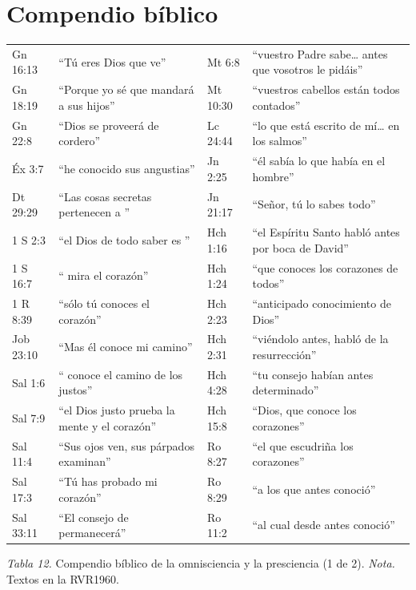 \section*{Compendio bíblico}
\begin{center}\small\renewcommand{\arraystretch}{1.12}
\begin{tabular}{@{}L{2.2cm}L{5.0cm}|L{2.2cm}L{5.0cm}@{}}
\toprule
Gn 16:13 & ``Tú eres Dios que ve'' & Mt 6:8 & ``vuestro Padre sabe\ldots{} antes que vosotros le pidáis'' \\
Gn 18:19 & ``Porque yo sé que mandará a sus hijos'' & Mt 10:30 & ``vuestros cabellos están todos contados'' \\
Gn 22:8 & ``Dios se proveerá de cordero'' & Lc 24:44 & ``lo que está escrito de mí\ldots{} en los salmos'' \\
Éx 3:7 & ``he conocido sus angustias'' & Jn 2:25 & ``él sabía lo que había en el hombre'' \\
Dt 29:29 & ``Las cosas secretas pertenecen a \SENOR{}'' & Jn 21:17 & ``Señor, tú lo sabes todo'' \\
1 S 2:3 & ``el Dios de todo saber es \SENOR{}'' & Hch 1:16 & ``el Espíritu Santo habló antes por boca de David'' \\
1 S 16:7 & ``\SENOR{} mira el corazón'' & Hch 1:24 & ``que conoces los corazones de todos'' \\
1 R 8:39 & ``sólo tú conoces el corazón'' & Hch 2:23 & ``anticipado conocimiento de Dios'' \\
Job 23:10 & ``Mas él conoce mi camino'' & Hch 2:31 & ``viéndolo antes, habló de la resurrección'' \\
Sal 1:6 & ``\SENOR{} conoce el camino de los justos'' & Hch 4:28 & ``tu consejo habían antes determinado'' \\
Sal 7:9 & ``el Dios justo prueba la mente y el corazón'' & Hch 15:8 & ``Dios, que conoce los corazones'' \\
Sal 11:4 & ``Sus ojos ven, sus párpados examinan'' & Ro 8:27 & ``el que escudriña los corazones'' \\
Sal 17:3 & ``Tú has probado mi corazón'' & Ro 8:29 & ``a los que antes conoció'' \\
Sal 33:11 & ``El consejo de \SENOR{} permanecerá'' & Ro 11:2 & ``al cual desde antes conoció'' \\
\bottomrule
\end{tabular}\par
{\footnotesize\color{gris}\textit{Tabla 12.} Compendio bíblico de la omnisciencia y la presciencia (1 de 2). \textit{Nota.} Textos en la RVR1960.}
\end{center}

